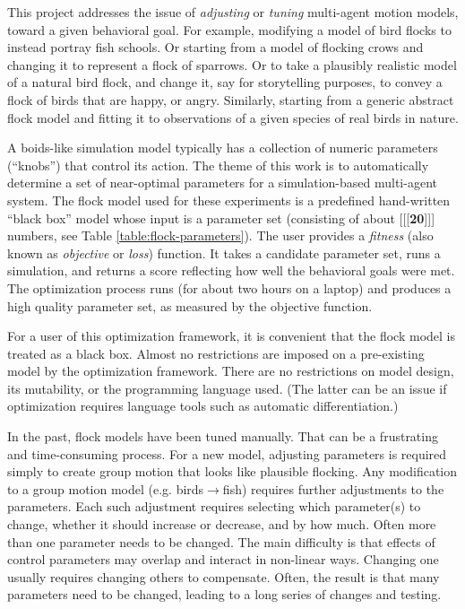 \documentclass[letterpaper]{article}
\begin{document}
This project addresses the issue of \textit{adjusting} or \textit{tuning} multi-agent motion models, toward a given behavioral goal. For example, modifying a model of bird flocks to instead portray fish schools. Or starting from a model of flocking crows and changing it to represent a flock of sparrows. Or to take a plausibly realistic model of a natural bird flock, and change it, say for storytelling purposes, to convey a flock of birds that are happy, or angry. Similarly, starting from a generic abstract flock model and fitting it to observations of a given species of real birds in nature.

A boids-like simulation model typically has a collection of numeric parameters (``knobs'') that control its action. The theme of this work is to automatically determine a set of near-optimal parameters for a simulation-based multi-agent system. The flock model used for these experiments is a predefined hand-written ``black box'' model whose input is a parameter set (consisting of about [[[\textbf{20}]]] numbers, see Table \ref{table:flock-parameters}). The user provides a \textit{fitness} (also known as \textit{objective} or \textit{loss}) function. It takes a candidate parameter set, runs a simulation, and returns a score reflecting how well the behavioral goals were met. The optimization process runs (for about two hours on a laptop) and produces a high quality parameter set, as measured by the objective function.

For a user of this optimization framework, it is convenient that the flock model is treated as a black box. Almost no restrictions are imposed on a pre-existing model by the optimization framework. There are no restrictions on model design, its mutability, or the programming language used. (The latter can be an issue if optimization requires language tools such as automatic differentiation.)

In the past, flock models have been tuned manually. That can be a frustrating and time-consuming process. For a new model, adjusting parameters is required simply to create group motion that looks like plausible flocking. Any modification to a group motion model (e.g. birds{$\rightarrow$}fish) requires further adjustments to the parameters. Each such adjustment requires selecting which parameter(s) to change, whether it should increase or decrease, and by how much. Often more than one parameter needs to be changed. The main difficulty is that effects of control parameters may overlap and interact in non-linear ways. Changing one usually requires changing others to compensate. Often, the result is that many parameters need to be changed, leading to a long series of changes and testing.
\end{document}
